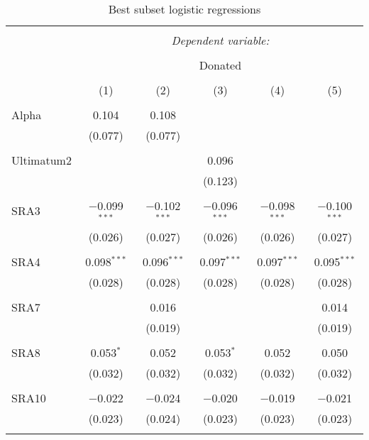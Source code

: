    
\begin{singlespace}
\begin{table}[H] \centering 
  \caption{Best subset logistic regressions} 
  \label{} 
     \begin{adjustbox}{width=\textwidth, totalheight=\baselineskip}
  \begin{tabular}{@{\extracolsep{5pt}}lccccc} 
\\[-1.8ex]\hline 
\hline \\[-1.8ex] 
 & \multicolumn{5}{c}{\textit{Dependent variable:}} \\ 
\cline{2-6} 
\\[-1.8ex] & \multicolumn{5}{c}{Donated} \\ 
\\[-1.8ex] & (1) & (2) & (3) & (4) & (5)\\ 
\hline \\[-1.8ex] 
 Alpha & 0.104 & 0.108 &  &  &  \\ 
  & (0.077) & (0.077) &  &  &  \\ 
  & & & & & \\ 
 Ultimatum2 &  &  & 0.096 &  &  \\ 
  &  &  & (0.123) &  &  \\ 
  & & & & & \\ 
 SRA3 & $-$0.099$^{***}$ & $-$0.102$^{***}$ & $-$0.096$^{***}$ & $-$0.098$^{***}$ & $-$0.100$^{***}$ \\ 
  & (0.026) & (0.027) & (0.026) & (0.026) & (0.027) \\ 
  & & & & & \\ 
 SRA4 & 0.098$^{***}$ & 0.096$^{***}$ & 0.097$^{***}$ & 0.097$^{***}$ & 0.095$^{***}$ \\ 
  & (0.028) & (0.028) & (0.028) & (0.028) & (0.028) \\ 
  & & & & & \\ 
 SRA7 &  & 0.016 &  &  & 0.014 \\ 
  &  & (0.019) &  &  & (0.019) \\ 
  & & & & & \\ 
 SRA8 & 0.053$^{*}$ & 0.052 & 0.053$^{*}$ & 0.052 & 0.050 \\ 
  & (0.032) & (0.032) & (0.032) & (0.032) & (0.032) \\ 
  & & & & & \\ 
 SRA10 & $-$0.022 & $-$0.024 & $-$0.020 & $-$0.019 & $-$0.021 \\ 
  & (0.023) & (0.024) & (0.023) & (0.023) & (0.023) \\ 
  & & & & & \\ 

\end{tabular}
\end{adjustbox}
\end{table}
\end{singlespace}
